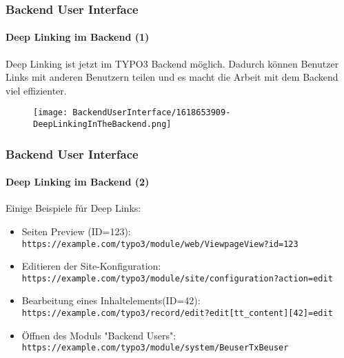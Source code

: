 %

\begin{frame}[fragile]
	\frametitle{Backend User Interface}
	\framesubtitle{Deep Linking im Backend (1)}

	Deep Linking ist jetzt im TYPO3 Backend möglich. Dadurch können Benutzer Links mit
	anderen Benutzern teilen und es macht die Arbeit mit dem Backend viel effizienter.

	\begin{figure}
		\texttt{[image: BackendUserInterface/1618653909-DeepLinkingInTheBackend.png]}
	\end{figure}

\end{frame}


\begin{frame}[fragile]
	\frametitle{Backend User Interface}
	\framesubtitle{Deep Linking im Backend (2)}

	Einige Beispiele für Deep Links:
	\vspace{0.2cm}
	\begin{itemize}
		\item Seiten Preview (ID=123):\newline
			\fontsize{8}{10}\texttt{https://example.com/typo3/module/web/ViewpageView?id=123}\normalsize
		\item Editieren der Site-Konfiguration:
			\fontsize{8}{10}\texttt{https://example.com/typo3/module/site/configuration?action=edit}\normalsize
		\item Bearbeitung eines Inhaltelements(ID=42):
			\fontsize{8}{10}\texttt{https://example.com/typo3/record/edit?edit[tt\_content][42]=edit}\normalsize
		\item Öffnen des Moduls "Backend Users":
			\fontsize{8}{10}\texttt{https://example.com/typo3/module/system/BeuserTxBeuser}\normalsize
	\end{itemize}

\end{frame}

